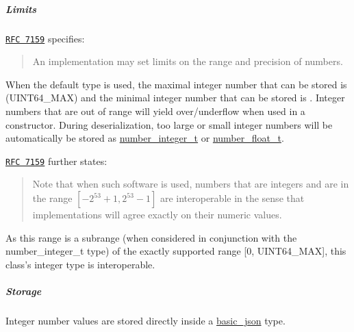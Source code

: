 \subparagraph*{Limits}

\href{http://rfc7159.net/rfc7159}{\tt R\-F\-C 7159} specifies\-: \begin{quotation}
An implementation may set limits on the range and precision of numbers.

\end{quotation}


When the default type is used, the maximal integer number that can be stored is {} (U\-I\-N\-T64\-\_\-\-M\-A\-X) and the minimal integer number that can be stored is {}. Integer numbers that are out of range will yield over/underflow when used in a constructor. During deserialization, too large or small integer numbers will be automatically be stored as \hyperlink{classnlohmann_1_1basic__json_ac4b10b2364f26ce47bdb9a413ff04a59}{number\-\_\-integer\-\_\-t} or \hyperlink{classnlohmann_1_1basic__json_a74a0013e847fdc574b48f931f0e757e1}{number\-\_\-float\-\_\-t}.

\href{http://rfc7159.net/rfc7159}{\tt R\-F\-C 7159} further states\-: \begin{quotation}
Note that when such software is used, numbers that are integers and are in the range $[-2^{53}+1, 2^{53}-1]$ are interoperable in the sense that implementations will agree exactly on their numeric values.

\end{quotation}


As this range is a subrange (when considered in conjunction with the number\-\_\-integer\-\_\-t type) of the exactly supported range \mbox{[}0, U\-I\-N\-T64\-\_\-\-M\-A\-X\mbox{]}, this class's integer type is interoperable.

\subparagraph*{Storage}

Integer number values are stored directly inside a \hyperlink{classnlohmann_1_1basic__json}{basic\-\_\-json} type.

